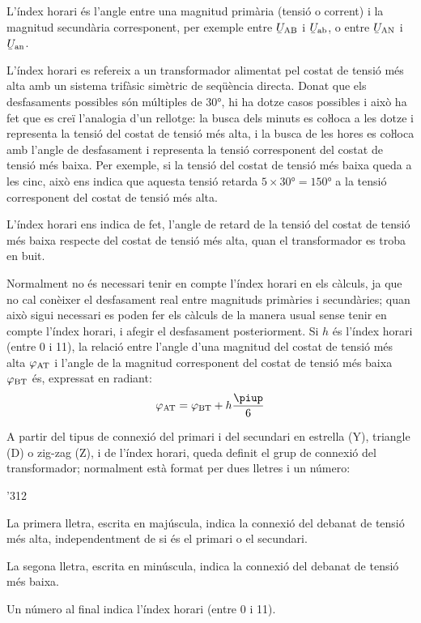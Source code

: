 L'índex horari és l'angle entre una magnitud  primària (tensió o corrent) i la magnitud secundària corresponent, per exemple entre $\cmplx{U}\ped{AB}$ i $\cmplx{U}\ped{ab}$, o entre $\cmplx{U}\ped{AN}$ i $\cmplx{U}\ped{an}$.

L'índex horari es refereix a un transformador alimentat pel costat de tensió més alta  amb un sistema trifàsic simètric de seqüència directa. Donat que els desfasaments possibles són múltiples de \ang{30}, hi ha dotze casos possibles i això ha fet que es creï l'analogia d'un rellotge: la busca dels minuts es coŀloca a les dotze i representa la tensió del costat de tensió més alta, i la busca de les hores es coŀloca amb l'angle de desfasament i representa la tensió corresponent del costat de tensió més baixa. Per exemple, si la tensió del costat de tensió més baixa queda a les cinc, això ens indica que aquesta tensió retarda $5\times \ang{30}= \ang{150}$ a la tensió corresponent del costat de tensió més alta.

L'índex horari ens indica de fet, l'angle de retard de la tensió del costat de tensió més baixa respecte del costat de tensió més alta, quan el transformador es troba en buit.

Normalment no és necessari tenir en compte l'índex horari en els càlculs, ja que no cal conèixer el desfasament real entre magnituds primàries i secundàries; quan això sigui necessari es poden fer els càlculs de la manera usual sense tenir en compte l'índex horari, i afegir el desfasament posteriorment. Si $h$ és l'índex horari (entre 0 i 11), la relació entre l'angle d'una magnitud del costat de tensió més alta $\varphi_\mathrm{AT}$ i l'angle de la magnitud corresponent del costat de tensió més baixa $\varphi_\mathrm{BT}$ és, expressat en radiant:
\begin{equation}
    \varphi\ped{AT} = \varphi\ped{BT} + h\frac{\piup}{6}\label{eq:fi-AT-BT}
\end{equation}


A partir del tipus de connexió del primari i del secundari en estrella (Y), triangle (D) o zig-zag (Z), i de l'índex horari, queda definit el grup de connexió del transformador; normalment està format per dues lletres i un número:
\begin{dingautolist}{'312}
   \item La primera lletra, escrita en majúscula, indica la connexió del debanat de tensió més alta, independentment de si és el primari o el secundari.
   \item La segona lletra, escrita en minúscula, indica la connexió del debanat de tensió més baixa.
   \item Un número al final indica l'índex horari (entre 0 i 11).
\end{dingautolist}

